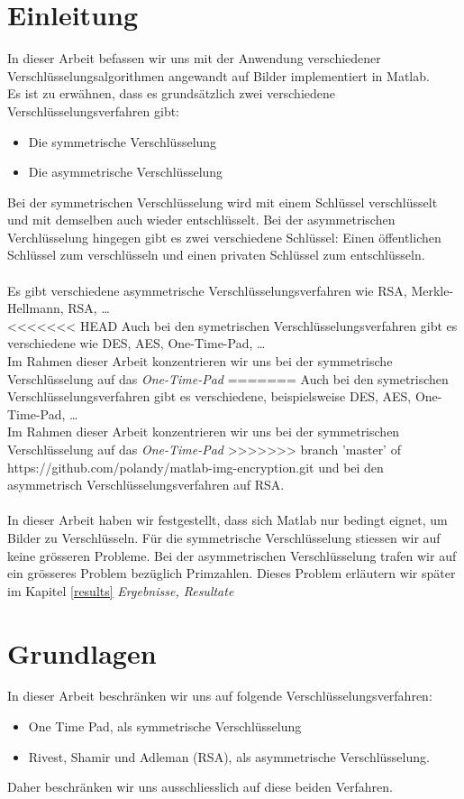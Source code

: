 \documentclass[paper=a4,fontsize=12pt]{scrartcl}
\begin{document}
\section{Einleitung}
In dieser Arbeit befassen wir uns mit der Anwendung verschiedener Verschlüsselungsalgorithmen
angewandt auf Bilder implementiert in Matlab. \\
Es ist zu erwähnen, dass es grundsätzlich zwei verschiedene Verschlüsselungsverfahren gibt:
\begin{itemize}
  \item Die symmetrische Verschlüsselung 
  \item Die asymmetrische Verschlüsselung 
\end{itemize}
Bei der symmetrischen Verschlüsselung wird mit einem Schlüssel verschlüsselt und mit demselben auch wieder entschlüsselt.
Bei der asymmetrischen Verchlüsselung hingegen gibt es zwei verschiedene Schlüssel: Einen öffentlichen Schlüssel zum verschlüsseln
und einen privaten Schlüssel zum entschlüsseln. \\ \\
Es gibt verschiedene asymmetrische Verschlüsselungsverfahren wie RSA, Merkle-Hellmann, RSA, \ldots \\
<<<<<<< HEAD
Auch bei den symetrischen Verschlüsselungsverfahren gibt es verschiedene wie DES, AES, One-Time-Pad, \ldots \\
Im Rahmen dieser Arbeit konzentrieren wir uns bei der symmetrische Verschlüsselung auf das \textit{One-Time-Pad} 
=======
Auch bei den symetrischen Verschlüsselungsverfahren gibt es verschiedene, beispielsweise DES, AES, One-Time-Pad, \ldots \\
Im Rahmen dieser Arbeit konzentrieren wir uns bei der symmetrischen Verschlüsselung auf das \textit{One-Time-Pad} 
>>>>>>> branch 'master' of https://github.com/polandy/matlab-img-encryption.git
und bei den asymmetrisch Verschlüsselungsverfahren auf RSA. \\ \\
In dieser Arbeit haben wir festgestellt, dass sich Matlab nur bedingt eignet, um Bilder zu Verschlüsseln.
Für die symmetrische Verschlüsselung stiessen wir auf keine grösseren Probleme. Bei der asymmetrischen Verschlüsselung
trafen wir auf ein grösseres Problem bezüglich Primzahlen. Dieses Problem erläutern wir später im Kapitel \ref{results} \textit{Ergebnisse, Resultate}

\newpage 
\section{Grundlagen} 
In dieser Arbeit beschränken wir uns auf folgende Verschlüsselungsverfahren:
\begin{itemize}
  \item One Time Pad, als symmetrische Verschlüsselung
  \item Rivest, Shamir und Adleman (RSA), als asymmetrische Verschlüsselung.
\end{itemize} 
Daher beschränken wir uns ausschliesslich auf diese beiden Verfahren. 
\end{document}
